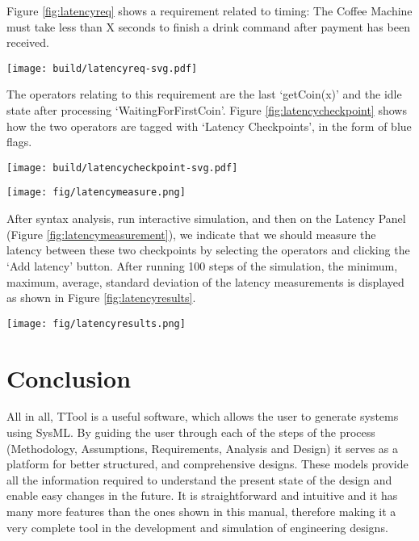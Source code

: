 \documentclass[12pt]{article}
\begin{document}
Figure \ref{fig:latencyreq} shows a requirement related to timing: The Coffee Machine must take less than X seconds to finish a drink command after payment has been received. 

\begin{figure*}[htbp]
\centering
\texttt{[image: build/latencyreq-svg.pdf]}
\caption{Latency Requirement for Coffee Machine} \label{fig:latencyreq}
\end{figure*}

The operators relating to this requirement are the last `getCoin(x)' and the idle state after processing `WaitingForFirstCoin'. Figure \ref{fig:latencycheckpoint} shows how the two operators are tagged with `Latency Checkpoints', in the form of blue flags.

\begin{figure*}[htbp]
\centering
\texttt{[image: build/latencycheckpoint-svg.pdf]}
\caption{Latency Checkpoints in State Machine Diagrams} \label{fig:latencycheckpoint}
\end{figure*}


\begin{figure*}[htbp]
\centering
\texttt{[image: fig/latencymeasure.png]}
\caption{Latency Measurement Panel} \label{fig:latencymeasurement}
\end{figure*}

After syntax analysis, run interactive simulation, and then on the Latency Panel (Figure \ref{fig:latencymeasurement}), we indicate that we should measure the latency between these two checkpoints by selecting the operators and clicking the `Add latency' button. After running 100 steps of the simulation, the minimum, maximum, average, standard deviation of the latency measurements is displayed as shown in Figure \ref{fig:latencyresults}.

\begin{figure*}[htbp]
\centering
\texttt{[image: fig/latencyresults.png]}
\caption{Latency Results} \label{fig:latencyresults}
\end{figure*}


\section{Conclusion}

	All in all, TTool is a useful software, which allows the user to generate systems using SysML. By guiding the user through each of the steps of the process (Methodology, Assumptions, Requirements, Analysis and Design) it serves as a platform for better structured, and comprehensive designs. These models provide all the information required to understand the present state of the design and enable easy changes in the future. It is straightforward and intuitive and it has many more features than the ones shown in this manual, therefore making it a very complete tool in the development and simulation of engineering designs. 
	
\end{document}
